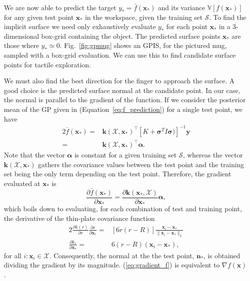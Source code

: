 We are now able to predict the target $y_* = \bar{f}(\mathbf{x}_*)$ and its variance $\mathbb{V}[f(\mathbf{x}_*)]$ for any given test point $\mathbf{x}_*$ in the workspace, %
given the training set $\mathcal{S}$. To find the implicit surface we need only exhaustively evaluate $y_*$ for each point $\mathbf{x}_*$ in a $3$-dimensional box-grid containing the object. The predicted surface points $\mathbf{x}_*$ are those where $y_* \simeq 0$. 
Fig.~\ref{fig:gpmug} shows an GPIS, for the pictured mug, sampled with a box-grid evaluation. We can use this to find candidate surface points for tactile exploration. 

We must also find the best direction for the finger to approach the surface. A good choice is the predicted surface normal at the candidate point. In our case, the normal is parallel to the gradient of the function. If we consider the posterior mean of the GP given in (Equation~\ref{eq:f_prediction}) for a single test point, we have
\begin{alignat}{2}
\bar{f}(\mathbf{x}_*) = & \mathbf{k}(\mathcal{X},\mathbf{x}_*)^\top [K + \boldsymbol{\sigma}^{T} I \boldsymbol{\sigma})]^{-1}\mathbf{y} \nonumber \\ = & \mathbf{k}(\mathcal{X},\mathbf{x}_*)^\top \boldsymbol{\alpha}.
\end{alignat}
Note that the vector $\boldsymbol{\alpha}$ is constant for a given training set $\mathcal{S}$, whereas the vector $\mathbf{k}(\mathcal{X},\mathbf{x}_*)$ gathers the covariance values between the test point and the training set being the only term depending on the test point. Therefore, the  gradient evaluated at $\mathbf{x}_*$ is
\begin{equation}
 \frac{\partial \bar{f}(\mathbf{x}_*)}{\partial \mathbf{x}_*} = \frac{\partial \mathbf{k}(\mathbf{x}_*,\mathcal{X})}{\partial \mathbf{x}_*} \boldsymbol{\alpha}, \label{eq:gradient_f}
\end{equation}
which boils down to evaluating, for each combination of test and training point, the derivative of the thin-plate covariance function
\begin{alignat}{2}
  \frac{\partial k(r)}{ \partial r} \frac{\partial r}{ \partial \mathbf{x}_*} = & [6r (r - R)] \frac{\mathbf{x}_i - \mathbf{x}_*}{\| \mathbf{x}_i - \mathbf{x}_* \|_2} \nonumber \\ \frac{\partial k_*}{ \partial \mathbf{x}_*} = & 6(r - R) (\mathbf{x}_i - \mathbf{x}_*),
\end{alignat}
for all $i : \mathbf{x}_i \in \mathcal{X}$. Consequently, the normal at the the test point, $\mathbf{n}_*$, is obtained dividing the gradient by its magnitude. (\ref{eq:gradient_f}) is equivalent to $\nabla f(\mathbf{x})$.


